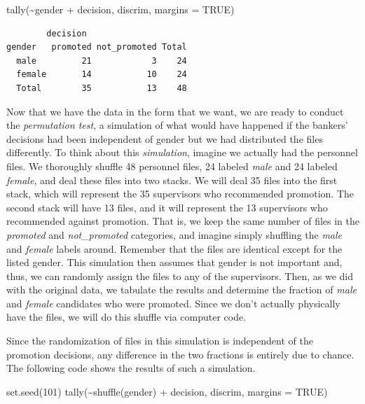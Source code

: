 \documentclass[
  letterpaper,
  DIV=11,
  numbers=noendperiod]{scrreprt}
\newenvironment{Shaded}{\begin{snugshade}}{\end{snugshade}}
\newcommand{\AttributeTok}[1]{\textcolor[rgb]{0.40,0.45,0.13}{#1}}
\newcommand{\ConstantTok}[1]{\textcolor[rgb]{0.56,0.35,0.01}{#1}}
\newcommand{\DecValTok}[1]{\textcolor[rgb]{0.68,0.00,0.00}{#1}}
\newcommand{\FunctionTok}[1]{\textcolor[rgb]{0.28,0.35,0.67}{#1}}
\newcommand{\NormalTok}[1]{\textcolor[rgb]{0.00,0.23,0.31}{#1}}
\newcommand{\SpecialCharTok}[1]{\textcolor[rgb]{0.37,0.37,0.37}{#1}}
\begin{document}
\begin{Shaded}
\begin{Highlighting}[]
\FunctionTok{tally}\NormalTok{(}\SpecialCharTok{\textasciitilde{}}\NormalTok{gender }\SpecialCharTok{+}\NormalTok{ decision, discrim, }\AttributeTok{margins =} \ConstantTok{TRUE}\NormalTok{)}
\end{Highlighting}
\end{Shaded}

\begin{verbatim}
        decision
gender   promoted not_promoted Total
  male         21            3    24
  female       14           10    24
  Total        35           13    48
\end{verbatim}

Now that we have the data in the form that we want, we are ready to
conduct the \emph{permutation test}, a simulation of what would have
happened if the bankers' decisions had been independent of gender but we
had distributed the files differently. To think about this
\emph{simulation}, imagine we actually had the personnel files. We
thoroughly shuffle 48 personnel files, 24 labeled \emph{male} and 24
labeled \emph{female}, and deal these files into two stacks. We will
deal 35 files into the first stack, which will represent the 35
supervisors who recommended promotion. The second stack will have 13
files, and it will represent the 13 supervisors who recommended against
promotion. That is, we keep the same number of files in the
\emph{promoted} and \emph{not\_promoted} categories, and imagine simply
shuffling the \emph{male} and \emph{female} labels around. Remember that
the files are identical except for the listed gender. This simulation
then assumes that gender is not important and, thus, we can randomly
assign the files to any of the supervisors. Then, as we did with the
original data, we tabulate the results and determine the fraction of
\emph{male} and \emph{female} candidates who were promoted. Since we
don't actually physically have the files, we will do this shuffle via
computer code.

Since the randomization of files in this simulation is independent of
the promotion decisions, any difference in the two fractions is entirely
due to chance. The following code shows the results of such a
simulation.

\begin{Shaded}
\begin{Highlighting}[]
\FunctionTok{set.seed}\NormalTok{(}\DecValTok{101}\NormalTok{)}
\FunctionTok{tally}\NormalTok{(}\SpecialCharTok{\textasciitilde{}}\FunctionTok{shuffle}\NormalTok{(gender) }\SpecialCharTok{+}\NormalTok{ decision, discrim, }\AttributeTok{margins =} \ConstantTok{TRUE}\NormalTok{)}
\end{Highlighting}
\end{Shaded}
\end{document}
